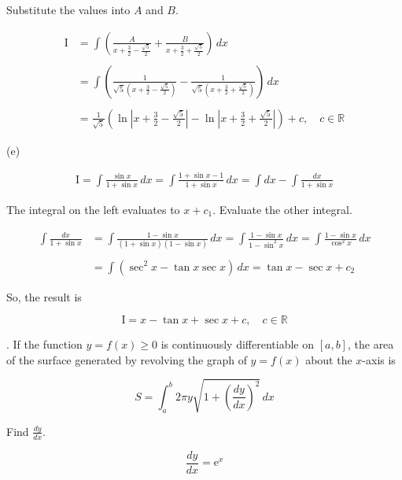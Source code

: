 \documentclass{article}
\begin{document}
\hfill

\noindent Substitute the values into $A$ and $B$.

\begin{align*}\mathrm{I}&=\int\left(\frac A{x+\frac32-\frac{\sqrt5}2}+\frac B{x+\frac32+\frac{\sqrt5}2}\right)\,dx\\\\&=\int\left(\frac1{\sqrt5\left(x+\frac32-\frac{\sqrt5}2\right)}-\frac1{\sqrt5\left(x+\frac32+\frac{\sqrt5}2\right)}\right)\,dx\\\\&=\boxed{\frac1{\sqrt5}\left(\ln\left|x+\frac32-\frac{\sqrt5}2\right|-\ln\left|x+\frac32+\frac{\sqrt5}2\right|\right)+c,\quad c\in\mathbb{R}}\end{align*}

\hfill

\noindent (e)

\begin{align*}\mathrm{I}=\int\frac{\sin x}{1+\sin x}\,dx=\int\frac{1+\sin x-1}{1+\sin x}\,dx=\int dx-\int\frac{dx}{1+\sin x}\end{align*}

\hfill

\noindent The integral on the left evaluates to $x+c_1$. Evaluate the other integral.

\begin{align*}\int\frac{dx}{1+\sin x}&=\int\frac{1-\sin x}{(1+\sin x)(1-\sin x)}\,dx=\int\frac{1-\sin x}{1-\sin^2x}\,dx=\int\frac{1-\sin x}{\cos^2x}\,dx\\\\&=\int\left(\sec^2x-\tan x\sec x\right)\,dx=\tan x-\sec x+c_2\end{align*}

\hfill

\noindent So, the result is

\[\mathrm{I}=\boxed{x-\tan x+\sec x+c,\quad c\in\mathbb{R}}\]

\hfill

. If the function $y=f(x)\geq0$ is continuously differentiable on $[a,b]$, the area of the surface generated by revolving the graph of $y=f(x)$ about the $x$-axis is

\[S=\int_a^b2\pi y\sqrt{1+\left(\frac{dy}{dx}\right)^2}\,dx\]

\hfill

\noindent Find $\displaystyle\frac{dy}{dx}$.

\[\frac{dy}{dx}=\mathrm{e}^x\]

\hfill
\end{document}
